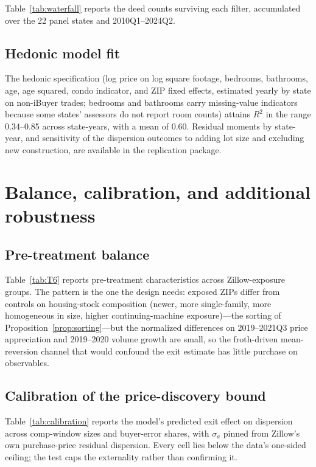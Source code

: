 Table~\ref{tab:waterfall} reports the deed counts surviving each filter,
accumulated over the 22 panel states and 2010Q1--2024Q2.



\subsection{Hedonic model fit}\label{app:data-hedonic}

The hedonic specification (log price on log square footage, bedrooms, bathrooms, age, age squared, condo indicator, and ZIP fixed effects, estimated yearly by state on non-iBuyer trades; bedrooms and bathrooms carry missing-value indicators because some states' assessors do not report room counts) attains $R^2$ in the range 0.34--0.85 across state-years, with a mean of 0.60. Residual moments by state-year, and sensitivity of the dispersion outcomes to adding lot size and excluding new construction, are available in the replication package.

\section{Balance, calibration, and additional robustness}\label{app:robustness}

\subsection{Pre-treatment balance}\label{app:balance}

Table~\ref{tab:T6} reports pre-treatment characteristics across Zillow-exposure groups. The pattern is the one the design needs: exposed ZIPs differ from controls on housing-stock composition (newer, more single-family, more homogeneous in size, higher continuing-machine exposure)---the sorting of Proposition~\ref{prop:sorting}---but the normalized differences on 2019--2021Q3 price appreciation and 2019--2020 volume growth are small, so the froth-driven mean-reversion channel that would confound the exit estimate has little purchase on observables.



\subsection{Calibration of the price-discovery bound}\label{app:calibration}

Table~\ref{tab:calibration} reports the model's predicted exit effect on dispersion across comp-window sizes and buyer-error shares, with $\sigma_a$ pinned from Zillow's own purchase-price residual dispersion. Every cell lies below the data's one-sided ceiling; the test caps the externality rather than confirming it.

